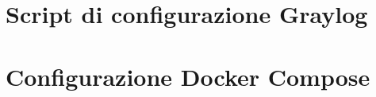 \documentclass[12pt,twoside]{report}
\begin{document}
\clearpage

\section{Script di configurazione Graylog}
\label{sec:code_graylog_script}



\clearpage

\section{Configurazione Docker Compose}
\label{sec:code_container_config}



\cleardoublepage


%
%

\beforebibliography




\end{document}
